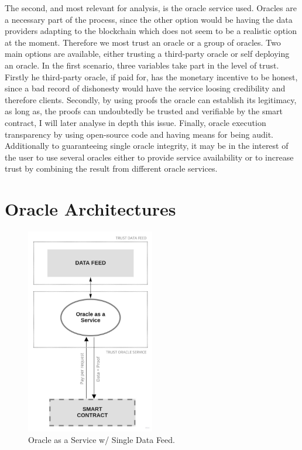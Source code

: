 The second, and most relevant for analysis, is the oracle service used. Oracles are a necessary part of the process, since the other option would be having the data providers adapting to the blockchain which does not seem to be a realistic option at the moment. Therefore we most trust an oracle or a group of oracles. Two main options are available, either trusting a third-party oracle or self deploying an oracle. In the first scenario, three variables take part in the level of trust. Firstly he third-party oracle, if paid for, has the monetary incentive to be honest, since a bad record of dishonesty would have the service loosing credibility and therefore clients. Secondly, by using proofs the oracle can establish its legitimacy, as long as, the proofs can undoubtedly be trusted and verifiable by the smart contract, I will later analyse in depth this issue. Finally, oracle execution transparency by using open-source code and having means for being audit. Additionally to guaranteeing single oracle integrity, it may be in the interest of the user to use several oracles either to provide service availability or to increase trust by combining the result from different oracle services. 


\section{Oracle Architectures}


\begin{figure}[t]
  \begin{center}
    \leavevmode
    \includegraphics[width=0.5\textwidth]{figures/oraclearch1.jpg}
    \caption{Oracle as a Service w/ Single Data Feed.}
    \label{fig:/figures/paper-screening}
  \end{center}
\end{figure}

